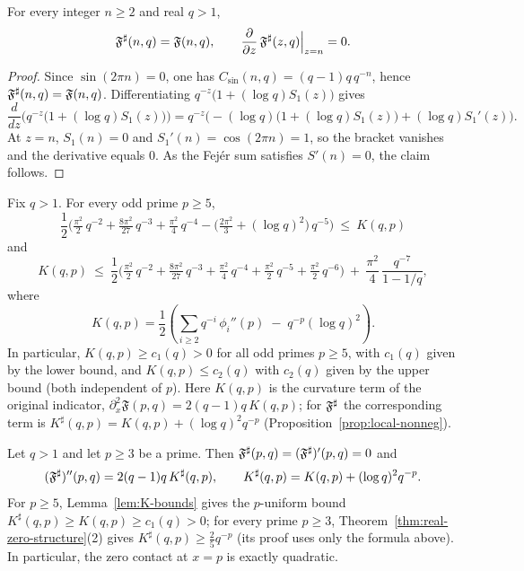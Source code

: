 \begin{lemma}\label{lem:int-tangent}
For every integer $n\ge2$ and real $q>1$,
\[
\mathfrak F^{\sharp}(n,q)=\mathfrak F(n,q),\qquad
\frac{\partial}{\partial z}\,\mathfrak F^{\sharp}(z,q)\Big|_{z=n}=0.
\]
\end{lemma}
\begin{proof}
Since $\sin(2\pi n)=0$, one has $C_{\sin}(n,q)=(q-1)q\,q^{-n}$, hence $\mathfrak F^{\sharp}(n,q)=\mathfrak F(n,q)$. Differentiating $q^{-z}\bigl(1+(\log q)S_1(z)\bigr)$ gives
\[
\frac{d}{dz}\Big(q^{-z}\bigl(1+(\log q)S_1(z)\bigr)\Big)
=q^{-z}\Big(-(\log q)\bigl(1+(\log q)S_1(z)\bigr)+(\log q)S_1'(z)\Big).
\]
At $z=n$, $S_1(n)=0$ and $S_1'(n)=\cos(2\pi n)=1$, so the bracket vanishes and the derivative equals $0$. As the Fej\'er sum satisfies $S'(n)=0$, the claim follows.
\end{proof}

\begin{lemma}\label{lem:K-bounds}
Fix $q>1$. For every odd prime $p\ge5$,
\[
\frac{1}{2}\Big(\tfrac{\pi^2}{2}\,q^{-2}+\tfrac{8\pi^2}{27}\,q^{-3}+\tfrac{\pi^2}{4}\,q^{-4}-\big(\tfrac{2\pi^2}{3}+(\log q)^2\big)\,q^{-5}\Big)
\ \le\ K(q,p)
\]
and
\[
K(q,p)\ \le\ \frac{1}{2}\Big(\tfrac{\pi^2}{2}\,q^{-2}+\tfrac{8\pi^2}{27}\,q^{-3}+\tfrac{\pi^2}{4}\,q^{-4}+\tfrac{\pi^2}{2}\,q^{-5}+\tfrac{\pi^2}{2}\,q^{-6}\Big)\ +\ \frac{\pi^2}{4}\,\frac{q^{-7}}{1-1/q},
\]
where
\[
K(q,p)=\frac{1}{2}\left(\sum_{i\ge2} q^{-i}\,\phi_i''(p)\;-\;q^{-p}(\log q)^2\right).
\]
In particular, $K(q,p)\ge c_1(q)>0$ for all odd primes $p\ge5$, with $c_1(q)$ given by the lower bound, and $K(q,p)\le c_2(q)$ with $c_2(q)$ given by the upper bound (both independent of $p$). Here $K(q,p)$ is the curvature term of the original indicator, $\partial_x^2\mathfrak F(p,q)=2(q-1)q\,K(q,p)$; for $\mathfrak F^{\sharp}$ the corresponding term is $K^\sharp(q,p)=K(q,p)+(\log q)^2q^{-p}$ (Proposition~\ref{prop:local-nonneg}).
\end{lemma}

\begin{proposition}\label{prop:local-nonneg}
Let $q>1$ and let $p\ge3$ be a prime. Then $\mathfrak F^{\sharp}(p,q)=(\mathfrak F^{\sharp})'(p,q)=0$ and
\[
(\mathfrak F^{\sharp})''(p,q)=2(q-1)q\,K^\sharp(q,p),\qquad K^\sharp(q,p)=K(q,p)+(\log q)^2q^{-p}.
\]
For $p\ge5$, Lemma~\ref{lem:K-bounds} gives the $p$-uniform bound $K^\sharp(q,p)\ge K(q,p)\ge c_1(q)>0$; for every prime $p\ge3$, Theorem~\ref{thm:real-zero-structure}(2) gives $K^\sharp(q,p)\ge\frac25q^{-p}$ (its proof uses only the formula above). In particular, the zero contact at $x=p$ is exactly quadratic.
\end{proposition}

